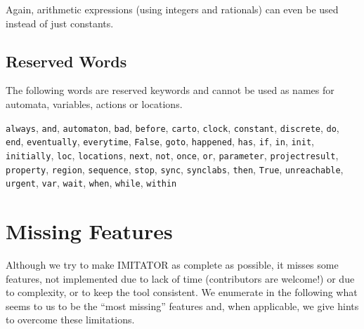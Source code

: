 \documentclass[a4paper,11pt]{report}
\newcommand{\imitator}{\textsf{IMITATOR}}
\newcommand{\styleIMI}[1]{\textcolor{imicolor}{\texttt{#1}}}
\begin{document}
Again, arithmetic expressions (using integers and rationals) can even be used instead of just constants.



\section{Reserved Words}

The following words are reserved keywords and cannot be used as names for automata, variables, actions or locations. 

\styleIMI{always},
\styleIMI{and},
\styleIMI{automaton},
\styleIMI{bad},
\styleIMI{before},
\styleIMI{carto},
\styleIMI{clock},
\styleIMI{constant},
\styleIMI{discrete},
\styleIMI{do},
\styleIMI{end},
\styleIMI{eventually},
\styleIMI{everytime},
\styleIMI{False},
\styleIMI{goto},
\styleIMI{happened},
\styleIMI{has},
\styleIMI{if},
\styleIMI{in},
\styleIMI{init},
\styleIMI{initially},
\styleIMI{loc},
\styleIMI{locations},
\styleIMI{next},
\styleIMI{not},
\styleIMI{once},
\styleIMI{or},
\styleIMI{parameter},
\styleIMI{projectresult},
\styleIMI{property},
\styleIMI{region},
\styleIMI{sequence},
\styleIMI{stop},
\styleIMI{sync},
\styleIMI{synclabs},
\styleIMI{then},
\styleIMI{True},
\styleIMI{unreachable},
\styleIMI{urgent},
\styleIMI{var},
\styleIMI{wait},
\styleIMI{when},
\styleIMI{while},
\styleIMI{within}






\chapter{Missing Features}

Although we try to make \imitator{} as complete as possible, it misses some features, not implemented due to lack of time (contributors are welcome!) or due to complexity, or to keep the tool consistent.
We enumerate in the following what seems to us to be the ``most missing'' features and, when applicable, we give hints to overcome these limitations.
\end{document}
